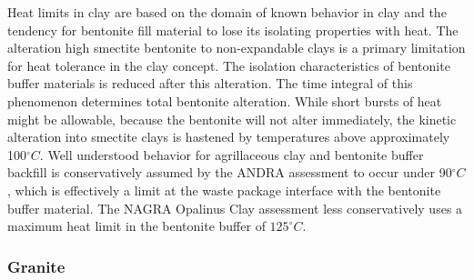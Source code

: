 Heat limits in clay are based on the domain of known behavior in clay and the 
tendency for bentonite fill material to lose its isolating properties with heat. 
The alteration high smectite bentonite to non-expandable clays is a primary 
limitation for heat tolerance in the clay concept. The isolation characteristics 
of bentonite buffer materials is reduced after this alteration. The time 
integral of this phenomenon determines total bentonite alteration. While short 
bursts of heat might be allowable, because the bentonite will not alter 
immediately, the kinetic alteration into smectite clays is hastened by 
temperatures above approximately 100$^\circ C$. \cite{pusch_alteration_1987} 
Well understood behavior for agrillaceous clay and bentonite buffer backfill
is conservatively assumed by the \gls{ANDRA} assessment to occur under 
90$^\circ C$, which is effectively a limit at the waste package interface with 
the bentonite buffer material.\cite{andra_argile:_2005} 
The \gls{NAGRA} Opalinus Clay assessment less conservatively 
uses a maximum heat limit in the bentonite buffer of $125^\circ C$.
\cite{johnson_project_2002} 


% 


\subsubsection{Granite}

